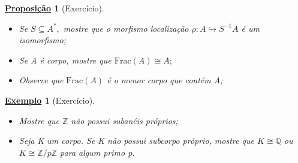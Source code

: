 \documentclass{article}
\newtheorem*{prop*}{\underline{Proposi\c c\~ao}}
\newtheorem{example}{\underline{Exemplo}}
\begin{document}
    \begin{prop*}[Exercício]
      \begin{itemize}
        \item[1)] Se \(S\subseteq A^{*},\) mostre que o morfismo localização \(\rho :A\hookrightarrow S^{-1}A\) é um isomorfismo;
        \item[2)] Se A é corpo, mostre que \(\mathrm{Frac}(A)\cong{A;}\)
        \item[3)] Observe que \(\mathrm{Frac}(A)\) é o menor corpo que contém A;
      \end{itemize}  
    \end{prop*}
    \begin{example}[Exercício]
      \begin{itemize}
        \item[1)] Mostre que \(\mathbb{Z}\) não possui subanéis próprios;
        \item[2)] Seja K um corpo. Se K não possui subcorpo próprio, mostre que \(K\cong{\mathbb{Q}}\) ou
          \(K\cong{\mathbb{Z}/p \mathbb{Z}}\) para algum primo p.
      \end{itemize}  
    \end{example}
\end{document}
